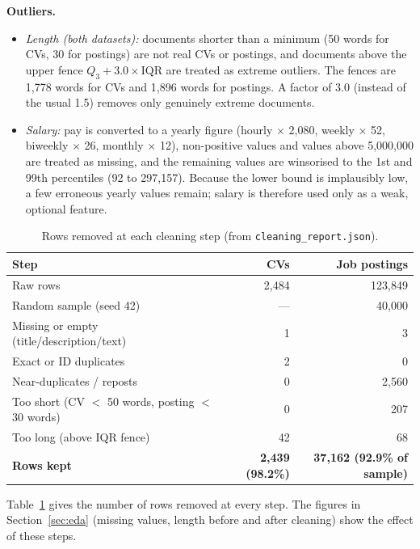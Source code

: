 \documentclass[11pt,a4paper]{article}
\begin{document}
\textbf{Outliers.}
\begin{itemize}
  \item \emph{Length (both datasets):} documents shorter than a minimum
  (50 words for CVs, 30 for postings) are not real CVs or postings, and
  documents above the upper fence $Q_3 + 3.0 \times \mathrm{IQR}$ are
  treated as extreme outliers. The fences are 1{,}778 words for CVs and
  1{,}896 words for postings. A factor of 3.0 (instead of the usual 1.5)
  removes only genuinely extreme documents.
  \item \emph{Salary:} pay is converted to a yearly figure (hourly
  $\times$ 2{,}080, weekly $\times$ 52, biweekly $\times$ 26, monthly
  $\times$ 12), non-positive values and values above 5{,}000{,}000 are
  treated as missing, and the remaining values are winsorised to the 1st
  and 99th percentiles (92 to 297{,}157). Because the lower bound is
  implausibly low, a few erroneous yearly values remain; salary is
  therefore used only as a weak, optional feature.
\end{itemize}

\begin{table}[htbp]
  \centering
  \small
  \begin{tabular}{@{}lrr@{}}
    \toprule
    Step & CVs & Job postings \\
    \midrule
    Raw rows & 2{,}484 & 123{,}849 \\
    Random sample (seed 42) & --- & 40{,}000 \\
    Missing or empty (title/description/text) & 1 & 3 \\
    Exact or ID duplicates & 2 & 0 \\
    Near-duplicates / reposts & 0 & 2{,}560 \\
    Too short (CV $<$ 50 words, posting $<$ 30 words) & 0 & 207 \\
    Too long (above IQR fence) & 42 & 68 \\
    \midrule
    \textbf{Rows kept} & \textbf{2{,}439 (98.2\%)} & \textbf{37{,}162 (92.9\% of sample)} \\
    \bottomrule
  \end{tabular}
  \caption{Rows removed at each cleaning step
  (from \texttt{cleaning\_report.json}).}
  \label{tab:cleaning}
\end{table}

Table~\ref{tab:cleaning} gives the number of rows removed at every
step. The figures in Section~\ref{sec:eda} (missing values, length
before and after cleaning) show the effect of these steps.
\end{document}
